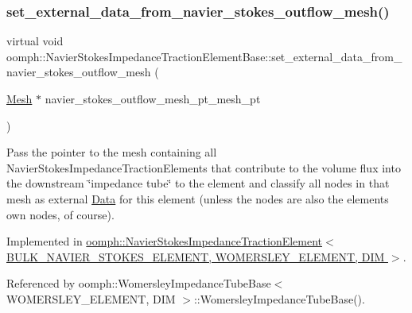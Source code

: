 \subsubsection{\texorpdfstring{set\+\_\+external\+\_\+data\+\_\+from\+\_\+navier\+\_\+stokes\+\_\+outflow\+\_\+mesh()}{set\_external\_data\_from\_navier\_stokes\_outflow\_mesh()}}
{\footnotesize\ttfamily virtual void oomph\+::\+Navier\+Stokes\+Impedance\+Traction\+Element\+Base\+::set\+\_\+external\+\_\+data\+\_\+from\+\_\+navier\+\_\+stokes\+\_\+outflow\+\_\+mesh (\begin{DoxyParamCaption}\item[{\hyperlink{classoomph_1_1Mesh}{Mesh} $\ast$}]{navier\+\_\+stokes\+\_\+outflow\+\_\+mesh\+\_\+pt\+\_\+mesh\+\_\+pt }\end{DoxyParamCaption})\hspace{0.3cm}{\ttfamily [pure virtual]}}



Pass the pointer to the mesh containing all Navier\+Stokes\+Impedance\+Traction\+Elements that contribute to the volume flux into the downstream \char`\"{}impedance tube\char`\"{} to the element and classify all nodes in that mesh as external \hyperlink{classoomph_1_1Data}{Data} for this element (unless the nodes are also the element\textquotesingle{}s own nodes, of course). 



Implemented in \hyperlink{classoomph_1_1NavierStokesImpedanceTractionElement_afd73c927eab27d77f54d83c67ef84a0f}{oomph\+::\+Navier\+Stokes\+Impedance\+Traction\+Element$<$ B\+U\+L\+K\+\_\+\+N\+A\+V\+I\+E\+R\+\_\+\+S\+T\+O\+K\+E\+S\+\_\+\+E\+L\+E\+M\+E\+N\+T, W\+O\+M\+E\+R\+S\+L\+E\+Y\+\_\+\+E\+L\+E\+M\+E\+N\+T, D\+I\+M $>$}.



Referenced by oomph\+::\+Womersley\+Impedance\+Tube\+Base$<$ W\+O\+M\+E\+R\+S\+L\+E\+Y\+\_\+\+E\+L\+E\+M\+E\+N\+T, D\+I\+M $>$\+::\+Womersley\+Impedance\+Tube\+Base().

\mbox{\label{classoomph_1_1NavierStokesImpedanceTractionElementBase_add9c7ae3f33b8e03805c256daf038ab4}} 
